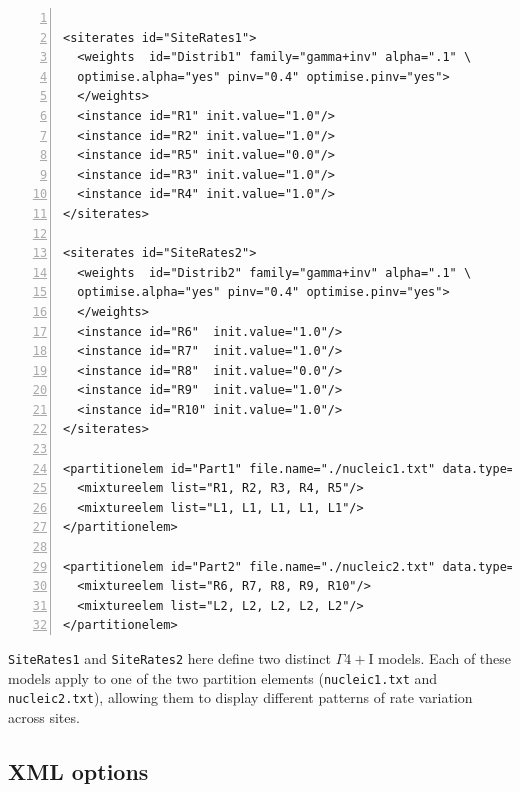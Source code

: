 \documentclass[a4paper,12pt]{article}
\newcommand{\x}[1]{\texttt{#1}}
\begin{document}
\vspace{0.2cm}
\begin{Verbatim}[frame=single, label=Two distinct $\Gamma4+$I models, samepage=true,
  baselinestretch=0.5, fontsize=\small, numbers=left]

<siterates id="SiteRates1">
  <weights  id="Distrib1" family="gamma+inv" alpha=".1" \
  optimise.alpha="yes" pinv="0.4" optimise.pinv="yes">
  </weights>
  <instance id="R1" init.value="1.0"/>
  <instance id="R2" init.value="1.0"/>
  <instance id="R5" init.value="0.0"/>
  <instance id="R3" init.value="1.0"/>
  <instance id="R4" init.value="1.0"/>
</siterates>

<siterates id="SiteRates2">
  <weights  id="Distrib2" family="gamma+inv" alpha=".1" \
  optimise.alpha="yes" pinv="0.4" optimise.pinv="yes">
  </weights>
  <instance id="R6"  init.value="1.0"/>
  <instance id="R7"  init.value="1.0"/>
  <instance id="R8"  init.value="0.0"/>
  <instance id="R9"  init.value="1.0"/>
  <instance id="R10" init.value="1.0"/>
</siterates>

<partitionelem id="Part1" file.name="./nucleic1.txt" data.type="nt">
  <mixtureelem list="R1, R2, R3, R4, R5"/>
  <mixtureelem list="L1, L1, L1, L1, L1"/>
</partitionelem>

<partitionelem id="Part2" file.name="./nucleic2.txt" data.type="nt">
  <mixtureelem list="R6, R7, R8, R9, R10"/>
  <mixtureelem list="L2, L2, L2, L2, L2"/>
</partitionelem>

\end{Verbatim}

\x{SiteRates1} and \x{SiteRates2} here define two distinct $\Gamma4+$I models. Each of these models apply to
one of the two partition elements (\x{nucleic1.txt} and \x{nucleic2.txt}), allowing them to display
different patterns of rate variation across sites.


\subsection{XML options}
\end{document}
